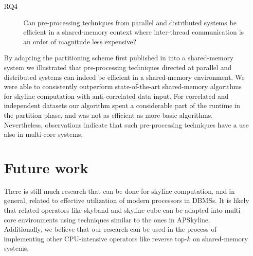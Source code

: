 \documentclass[12pt,a4paper,twoside]{report}
\begin{document}
\begin{description}
	\item[RQ4] Can pre-processing techniques from parallel and
	distributed systems be efficient in a shared-memory context where
	inter-thread communication is an order of magnitude less
	expensive?  
\end{description}

By adapting the partitioning scheme first published in
\cite{vlachou2008angle} into a shared-memory system we illustrated
that pre-processing techniques directed at parallel and distributed
systems can indeed be efficient in a shared-memory environment. We
were able to consistently outperform state-of-the-art shared-memory
algorithms for skyline computation with anti-correlated data input.
For correlated and independent datasets our algorithm spent a
considerable part of the runtime in the partition phase, and was not
as efficient as more basic algorithms. Nevertheless, observations
indicate that such pre-processing techniques have a use also in
multi-core systems.



\section{Future work}

There is still much research that can be done for skyline computation,
and in general, related to effective utilization of modern processors
in DBMSs. It is likely that related operators like skyband
\cite{papadias2005progressive,chen2010effective} and skyline cube
\cite{yuan2005efficient} can be adapted into multi-core environments
using techniques similar to the ones in APSkyline. Additionally, we
believe that our research can be used in the process of implementing
other CPU-intensive operators like reverse top-$k$
\cite{vlachou2010reverse,vlachou2013branch} on shared-memory
systems.
\end{document}
